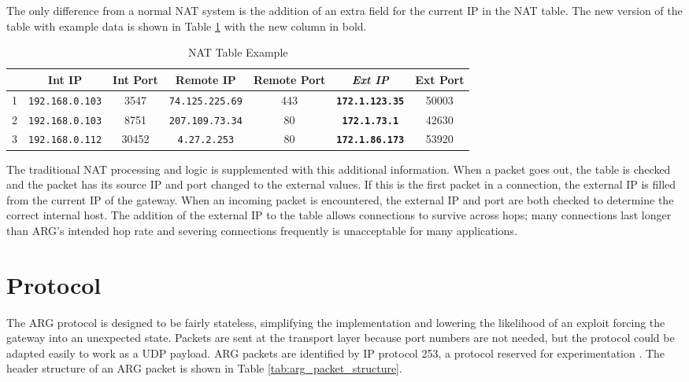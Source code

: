 \par The only difference from a normal \ac{NAT} system is the addition of an extra field for the current \ac{IP} in the \ac{NAT} table. The new version of the table with example data is shown in Table \ref{tab:arg_nat_example} with the new column in bold.

\begin{table}
\caption{NAT Table Example}
\label{tab:arg_nat_example}
\centering
\begin{tabular}{r|cccccc}
  & \textbf{Int IP}  & \textbf{Int Port}  & \textbf{Remote IP}  & \textbf{Remote Port}  & \textbf{\textit{Ext IP}}  & \textbf{Ext Port} \\
\hline
1 & \texttt{192.168.0.103} & 3547 & \texttt{74.125.225.69} & 443 & \textbf{\texttt{172.1.123.35}} & 50003\\
2 & \texttt{192.168.0.103} & 8751 & \texttt{207.109.73.34} & 80 & \textbf{\texttt{172.1.73.1}} & 42630\\
3 & \texttt{192.168.0.112} & 30452 & \texttt{4.27.2.253} & 80 & \textbf{\texttt{172.1.86.173}} & 53920
\end{tabular}
\end{table}

\par The traditional \ac{NAT} processing and logic is supplemented with this additional information. When a packet goes out, the table is checked and the packet has its source IP and port changed to the external values. If this is the first packet in a connection, the external IP is filled from the current IP of the gateway. When an incoming packet is encountered, the external IP and port are both checked to determine the correct internal host. The addition of the external IP to the table allows connections to survive across hops; many connections last longer than \ac{ARG}'s intended hop rate and severing connections frequently is unacceptable for many applications. 

\section{Protocol}
\label{sec:arg_protocol}
\par The \ac{ARG} protocol is designed to be fairly stateless, simplifying the implementation and lowering the likelihood of an exploit forcing the gateway into an unexpected state. Packets are sent at the transport layer because port numbers are not needed, but the protocol could be adapted easily to work as a \ac{UDP} payload. \ac{ARG} packets are identified by \ac{IP} protocol 253, a protocol reserved for experimentation \cite{rfc3692}. The header structure of an \ac{ARG} packet is shown in Table \ref{tab:arg_packet_structure}.

